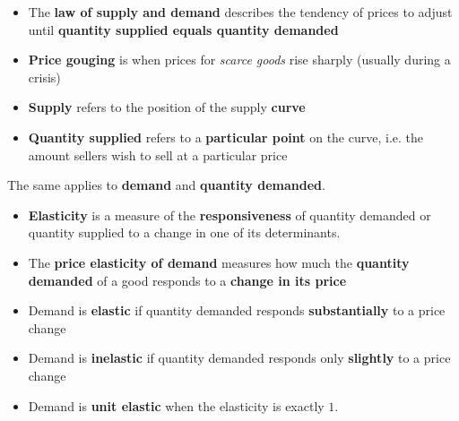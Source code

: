 \documentclass[12pt,a4paper]{article}
\begin{document}
\begin{itemize}
    \item The \textbf{law of supply and demand} describes the tendency of prices to adjust until \textbf{quantity supplied equals quantity demanded}
\end{itemize}

\begin{itemize}
    \item \textbf{Price gouging} is when prices for \emph{scarce goods} rise sharply (usually during a crisis)
\end{itemize}

\begin{itemize}
    \item \textbf{Supply} refers to the position of the supply \textbf{curve}
    \item \textbf{Quantity supplied} refers to a \textbf{particular point} on the curve, i.e. the amount sellers wish to sell at a particular price
\end{itemize}

\noindent The same applies to \textbf{demand} and \textbf{quantity demanded}.

\newpage


\begin{itemize}
    \item \textbf{Elasticity} is a measure of the \textbf{responsiveness} of quantity demanded or quantity supplied to a change in one of its determinants.
    \item The \textbf{price elasticity of demand} measures how much the \textbf{quantity demanded} of a good responds to a \textbf{change in its price}
    \item Demand is \textbf{elastic} if quantity demanded responds \textbf{substantially} to a price change
    \item Demand is \textbf{inelastic} if quantity demanded responds only \textbf{slightly} to a price change
    \item Demand is \textbf{unit elastic} when the elasticity is exactly $1$.
\end{itemize}

\end{document}
